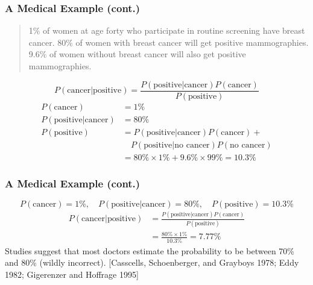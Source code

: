 \documentclass{beamer}
\begin{document}

	\begin{frame}
		\frametitle{A Medical Example (cont.)}
		\begin{quote}
			1\% of women at age forty who participate in routine screening have breast cancer.  80\% of women with breast cancer will get positive mammographies.  9.6\% of women without breast cancer will also get positive mammographies. 
		\end{quote}
		\begin{displaymath}
			P(\text{cancer} |\text{positive})=\frac{P(\text{positive} |				\text{cancer})P(\text{cancer})}{P(\text{positive})}
		\end{displaymath}
		\pause
		\begin{align*}
		P(\text{cancer}) &= 1\% \\
		P(\text{positive} |\text{cancer}) &= 80\% \\
		P(\text{positive}) &= P(\text{positive}|\text{cancer})P(\text{cancer}) + \\
			&\quad P(\text{positive}|\text{no cancer})P(\text{no cancer}) \\
			&= 80\% \times 1\% + 9.6\% \times 99\% = 10.3\%
		\end{align*}
	\end{frame}

	\begin{frame}
		\frametitle{A Medical Example (cont.)}
		\begin{displaymath}
		P(\text{cancer}) = 1\%,\quad P(\text{positive} |\text{cancer}) = 80\%, \quad
		P(\text{positive}) = 10.3\%
		\end{displaymath}
		\pause
		\begin{align*}
			P(\text{cancer} |\text{positive})&=\frac{P(\text{positive} |				\text{cancer})P(\text{cancer})}{P(\text{positive})}\\
				&= \frac{80 \% \times 1\%}{10.3 \%} = 7.77 \%
		\end{align*}
		\pause
		Studies suggest that most doctors estimate the probability to be between 70\% and 80\% (wildly incorrect). [Casscells, Schoenberger, and Grayboys 1978; Eddy 1982; Gigerenzer and Hoffrage 1995]
	\end{frame}

\end{document}
